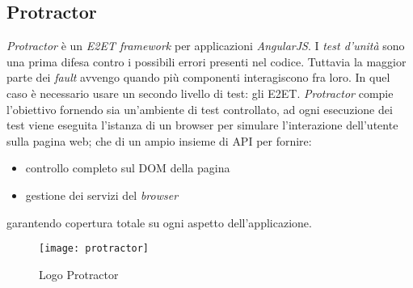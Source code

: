 \subsection{Protractor}
\textit{Protractor} è un \textit{\gls{E2ET} framework} per applicazioni
\textit{AngularJS}. I \textit{test d'unità} sono una prima difesa contro i
possibili errori presenti nel codice. Tuttavia la maggior parte dei
\textit{fault} avvengo quando più componenti interagiscono fra loro.
In quel caso è necessario usare un secondo livello di test: gli \gls{E2ET}.
\textit{Protractor} compie l'obiettivo fornendo sia un'ambiente di test
controllato, ad ogni esecuzione dei test viene eseguita l'istanza di un browser
per simulare l'interazione dell'utente sulla pagina web; che di un ampio insieme
di \gls{API} per fornire:
\begin{itemize}
\item controllo completo sul \gls{DOM} della pagina
\item gestione dei servizi del \textit{browser}
\end{itemize}
garantendo copertura totale su ogni aspetto dell'applicazione.

\begin{figure}[H]
\begin{center}
\texttt{[image: protractor]}
\caption{Logo Protractor}
\label{fig:protractor_logo}
\end{center}
\end{figure}
